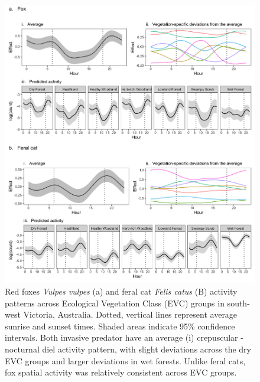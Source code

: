 \documentclass[]{elsarticle} %
\begin{document}
\begin{figure}
\includegraphics[width=1\linewidth]{../figs/predator_veg} \caption{Red foxes \textit{Vulpes vulpes} (a) and feral cat \textit{Felis catus} (B) activity patterns across Ecological Vegetation Class (EVC) groups in south-west Victoria, Australia. Dotted, vertical lines represent average sunrise and sunset times. Shaded areas indicate 95\% confidence intervals. Both invasive predator have an average (i) crepuscular - nocturnal diel activity pattern, with slight deviations across the dry EVC groups and larger deviations in wet forests. Unlike feral cats, fox spatial activity was relatively consistent across EVC groups.}\label{fig:veg}
\end{figure}

\newpage
\end{document}
